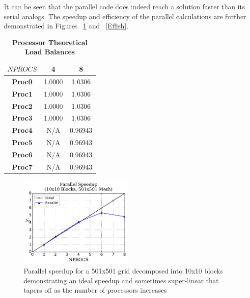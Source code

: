 \documentclass[twocolumn,10pt]{asme2ej}
\begin{document}
It can be seen that the parallel code does indeed reach a solution faster than its serial analogs.  The speedup and efficiency of the parallel calculations are further demonstrated in Figures ~\ref{Speedup} and ~\ref{Effish}.

\vspace{-1.8em}
\begin{table}[htb]
\begin{center}
\caption{\textbf{Processor Theoretical Load Balances}}
\begin{tabular}{|c | c c|}
\hline
\textbf{$NPROCS$} & 4   & 8     \\
\hline
\textbf{Proc0}    & 1.0000 & 1.0306 \\
\textbf{Proc1}    & 1.0000 & 1.0306 \\
\textbf{Proc2}    & 1.0000 & 1.0306 \\
\textbf{Proc3}    & 1.0000 & 1.0306 \\
\textbf{Proc4}    & N/A    & 0.96943 \\
\textbf{Proc5}    & N/A    & 0.96943 \\
\textbf{Proc6}    & N/A    & 0.96943 \\
\textbf{Proc7}    & N/A    & 0.96943 \\
\hline
\end{tabular}
\label{Load}
\end{center}
\end{table}
\vspace{-2.3em}


\begin{figure}[htb]
\begin{center}
\includegraphics[width=0.5\textwidth]{../Results/Speedup.pdf}
\caption{Parallel speedup for a 501x501 grid decomposed into 10x10 blocks demonstrating an ideal speedup and sometimes super-linear that tapers off as the number of processors increases}
\label{Speedup}
\end{center}
\end{figure}
\end{document}
